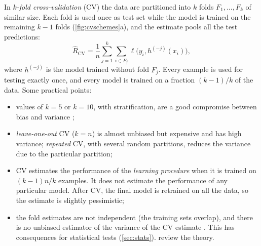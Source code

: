 In \emph{$k$-fold cross-validation} (CV) the data are partitioned into $k$ folds
$F_1,\dots,F_k$ of similar size. Each fold is used once as test set while the model is
trained on the remaining $k-1$ folds (\cref{fig:cvschemes}a), and the estimate pools all the
test predictions:
\begin{equation}
  \widehat{R}_{\text{CV}}=\frac1n\sum_{j=1}^{k}\sum_{i\in F_j}\ell\bigl(y_i,h^{(-j)}(x_i)\bigr),
\end{equation}
where $h^{(-j)}$ is the model trained without fold $F_j$. Every example is used for testing
exactly once, and every model is trained on a fraction $(k-1)/k$ of the data. Some practical
points:
\begin{itemize}
  \item values of $k=5$ or $k=10$, with stratification, are a good compromise between bias
        and variance \citep{kohavi1995study};
  \item \emph{leave-one-out} CV ($k=n$) is almost unbiased but expensive and has high
        variance; \emph{repeated} CV, with several random partitions, reduces the variance
        due to the particular partition;
  \item CV estimates the performance of the \emph{learning procedure} when it is trained on
        $(k-1)n/k$ examples. It does not estimate the performance of any particular model. After CV, the final model is retrained
        on all the data, so the estimate is slightly pessimistic;
  \item the fold estimates are not independent (the training sets overlap), and there is no
        unbiased estimator of the variance of the CV estimate \citep{bengio2004no}. This has
        consequences for statistical tests (\cref{sec:stats}). \citet{arlot2010survey} review
        the theory.
\end{itemize}

